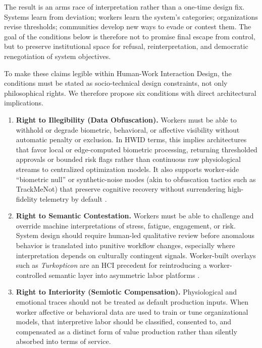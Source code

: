 \documentclass[runningheads]{llncs}
\begin{document}
The result is an arms race of interpretation rather than a one-time design fix. Systems learn from deviation; workers learn the system's categories; organizations revise thresholds; communities develop new ways to evade or contest them. The goal of the conditions below is therefore not to promise final escape from control, but to preserve institutional space for refusal, reinterpretation, and democratic renegotiation of system objectives.

To make these claims legible within Human-Work Interaction Design, the conditions must be stated as socio-technical design constraints, not only philosophical rights. We therefore propose six conditions with direct architectural implications.

\begin{enumerate}
\item \textbf{Right to Illegibility (Data Obfuscation).} Workers must be able to withhold or degrade biometric, behavioral, or affective visibility without automatic penalty or exclusion. In HWID terms, this implies architectures that favor local or edge-computed biometric processing, returning thresholded approvals or bounded risk flags rather than continuous raw physiological streams to centralized optimization models. It also supports worker-side ``biometric null'' or synthetic-noise modes (akin to obfuscation tactics such as TrackMeNot) that preserve cognitive recovery without surrendering high-fidelity telemetry by default \cite{nissenbaum2015obfuscation}.

\item \textbf{Right to Semantic Contestation.} Workers must be able to challenge and override machine interpretations of stress, fatigue, engagement, or risk. System design should require human-led qualitative review before anomalous behavior is translated into punitive workflow changes, especially where interpretation depends on culturally contingent signals. Worker-built overlays such as \emph{Turkopticon} are an HCI precedent for reintroducing a worker-controlled semantic layer into asymmetric labor platforms \cite{irani2013turkopticon}.

\item \textbf{Right to Interiority (Semiotic Compensation).} Physiological and emotional traces should not be treated as default production inputs. When worker affective or behavioral data are used to train or tune organizational models, that interpretive labor should be classified, consented to, and compensated as a distinct form of value production rather than silently absorbed into terms of service.


\end{enumerate}
\end{document}
